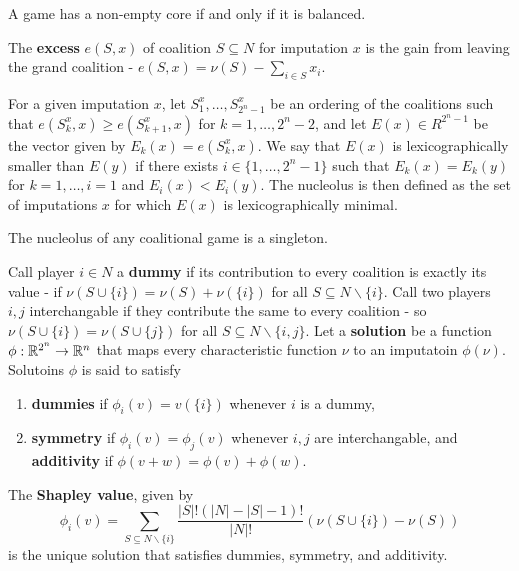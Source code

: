 \begin{thm}
  \label{sec:cooperative-games-3}
  A game has a non-empty core if and only if it is balanced.
\end{thm}



\begin{defn}
  \label{sec:cooperative-games-5}
  The \textbf{excess} $e(S, x)$ of coalition $S \subseteq N$ for
  imputation $x$ is the gain from leaving the grand coalition - $e(S,
  x) = \nu(S) - \sum_{i \in S}^{} x_{i}$.

  For a given imputation $x$, let $S_{1}^{x}, \dots, S_{2^{n}-1}^{x}$
  be an ordering of the coalitions such that $e(S^{x}_{k}, x) \geq
  e(S_{k+1}^{x}, x)$ for $k = 1, \dots, 2^{n} - 2$, and let $E(x) \in
  R^{2^{n} - 1}$ be the vector given by $E_{k}(x) = e(S_{k}^{x}, x)$.
  We say that $E(x)$ is lexicographically smaller than $E(y)$ if there
  exists $i \in \{ 1, \dots, 2^{n} - 1 \} $ such that $E_{k}(x) =
  E_{k}(y)$ for $k = 1, \dots, i=1$ and $E_{i} (x) < E_{i}(y)$. The
  nucleolus is then defined as the set of imputations $x$ for which
  $E(x)$ is lexicographically minimal.
\end{defn}

\begin{thm}
  \label{sec:cooperative-games-6}
  The nucleolus of any coalitional game is a singleton.
\end{thm}

\begin{defn}
  \label{sec:cooperative-games-7}
  Call player $i \in N$ a \textbf{dummy} if its contribution to every
  coalition is exactly its value - if $\nu(S \cup \{ i \} ) = \nu(S) +
  \nu(\{ i \} )$ for all $S \subseteq N \backslash \{ i \} $. Call two
  players $i, j$ interchangable if they contribute the same to every
  coalition - so $\nu(S \cup \{ i \} ) = \nu(S \cup \{ j \} )$ for all
  $S \subseteq N \backslash \{ i, j \} $. Let a \textbf{solution} be a
  function $\phi: \mathbb{R}^{2^{n}} \rightarrow \mathbb{R}^{n}$ that maps every
  characteristic function $\nu$ to an imputatoin $\phi(\nu)$.
  Solutoins $\phi$ is said to satisfy
  \begin{enumerate}
  \item \textbf{dummies} if $\phi_{i}(v) = v(\{ i \} )$ whenever $i$
    is a dummy,
  \item \textbf{symmetry} if $\phi_{i}(v) = \phi_{j}(v)$ whenever $i,
    j$ are interchangable, and \textbf{additivity} if $\phi(v + w) =
    \phi(v) + \phi(w)$.
  \end{enumerate}
\end{defn}
\begin{thm}
  \label{sec:cooperative-games-8}
  The \textbf{Shapley value}, given by
  \begin{equation}
    \label{eq:21}
    \phi_{i}(v) = \sum_{S \subseteq N \backslash \{ i \} }^{}
    \frac{|S|!(|N| - |S| - 1)!}{|N|!} (\nu(S \cup \{ i \} ) - \nu(S))
  \end{equation} is the unique solution that satisfies dummies,
  symmetry, and additivity.
\end{thm}

